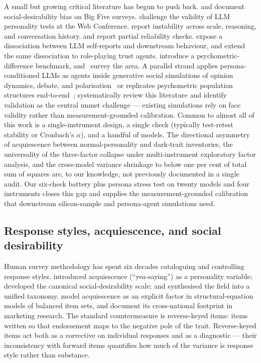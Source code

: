 \documentclass[11pt]{article}
\begin{document}
A small but growing critical literature has begun to push back. \citet{acerbi2024llm} and \citet{salecha2024llm} document social-desirability bias on Big Five surveys. \citet{suhr2025challenging} challenge the validity of LLM personality tests at the Web Conference. \citet{pelet2025persistent} report instability across scale, reasoning, and conversation history. \citet{hagendorff2024machine} and \citet{schaekermann2024personality} report partial reliability checks. \citet{han2025personality} expose a dissociation between LLM self-reports and downstream behaviour, and \citet{mannekote2025roleplaying} extend the same dissociation to role-playing trust agents. \citet{xie2025aipsychobench} introduce a psychometric-difference benchmark, and~\citet{chen2025humanizing} survey the area. A parallel strand applies persona-conditioned LLMs as agents inside generative social simulations of opinion dynamics, debate, and polarisation~\citep{chuang2023simulating,cau2025language,chuang2025debate} or replicates psychometric population structures end-to-end~\citep{ferreira2025matching}; \citet{larooij2025validation} systematically review this literature and identify validation as the central unmet challenge --- existing simulations rely on face validity rather than measurement-grounded calibration. Common to almost all of this work is a single-instrument design, a single check (typically test-retest stability or Cronbach's $\alpha$), and a handful of models. The directional asymmetry of acquiescence between normal-personality and dark-trait inventories, the universality of the three-factor collapse under multi-instrument exploratory factor analysis, and the cross-model variance shrinkage to below one per cent of total sum of squares are, to our knowledge, not previously documented in a single audit. Our six-check battery plus persona stress test on twenty models and four instruments closes this gap and supplies the measurement-grounded calibration that downstream silicon-sample and persona-agent simulations need.

\subsection{Response styles, acquiescence, and social desirability}
\label{sec:related-styles}

Human survey methodology has spent six decades cataloguing and controlling response styles. \citet{couch1960yeasayers} introduced acquiescence (``yea-saying'') as a personality variable; \citet{crowne1960social} developed the canonical social-desirability scale; and \citet{paulhus1991response} synthesised the field into a unified taxonomy. \citet{billiet2000modeling} model acquiescence as an explicit factor in structural-equation models of balanced item sets, and \citet{baumgartner2007modeling} document its cross-national footprint in marketing research. The standard countermeasure is reverse-keyed items: items written so that endorsement maps to the negative pole of the trait. Reverse-keyed items act both as a corrective on individual responses and as a diagnostic --- their inconsistency with forward items quantifies how much of the variance is response style rather than substance.
\end{document}
